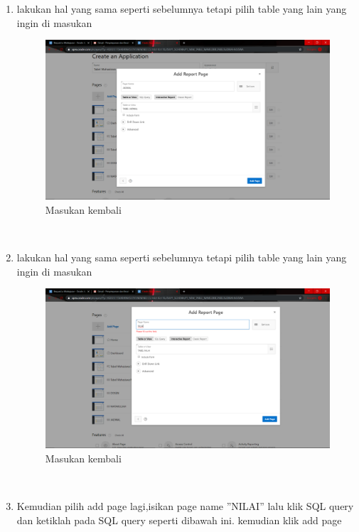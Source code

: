 \begin{enumerate}
\item lakukan hal yang sama seperti sebelumnya tetapi pilih table yang lain yang ingin di masukan
\begin{figure}[H]
    \centering
    \includegraphics[scale=0.2]{figures/24}
    \caption{Masukan kembali}
    \label{Automatic2}
\end{figure} \\

\item lakukan hal yang sama seperti sebelumnya tetapi pilih table yang lain yang ingin di masukan
\begin{figure}[H]
    \centering
    \includegraphics[scale=0.2]{figures/25}
    \caption{Masukan kembali}
    \label{Automatic3}
\end{figure} \\

\item Kemudian pilih add page lagi,isikan page name ”NILAI” lalu klik SQL query dan ketiklah pada SQL query seperti dibawah ini. kemudian klik add page \\


\end{enumerate}
